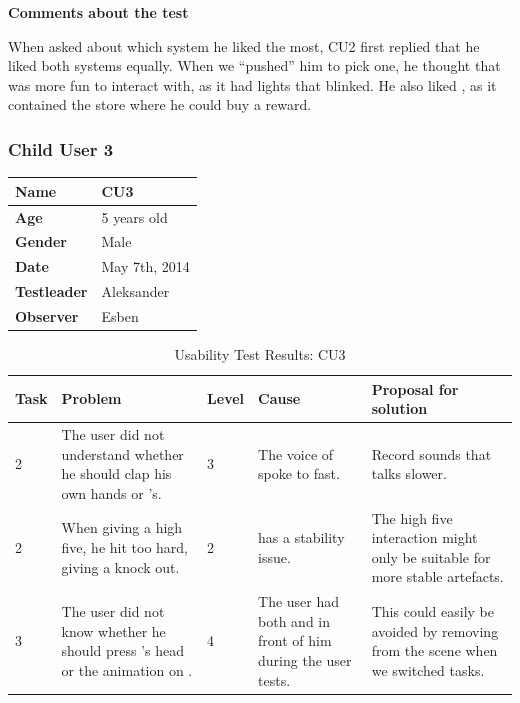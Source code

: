 \textbf{Comments about the test}

When asked about which system he liked the most, CU2 first replied that he liked both systems equally. When we ``pushed'' him to pick one, he thought that \ab{} was more fun to interact with, as it had lights that blinked. He also liked \app{}, as it contained the store where he could buy a reward. 

\subsubsection{Child User 3}
\begin{table}[H]
\centering
\begin{tabular}{| p{4.0cm} | p{4.0cm} |}
\hline
 \textbf{Name} & CU3 \\
 \hline
 \textbf{Age} & 5 years old \\
 \hline 
 \textbf{Gender} & Male \\
 \hline
 \textbf{Date} & May 7th, 2014 \\
 \hline
 \textbf{Testleader} & Aleksander \\
 \hline
 \textbf{Observer} & Esben \\
 \hline
\end{tabular}
\end{table}


\begin{table}[H]
\centering
\begin{tabular}{| p{1.0cm} | p{4.0cm} | p{0.9cm} | p{3.1cm} | p{3.5cm} |}
	\hline
	\textbf{Task} & \textbf{Problem} & \textbf{Level} & \textbf{Cause} & \textbf{Proposal for solution} \\
	\hline
	2 & The user did not understand whether he should clap his own hands or \ab{}'s. & 3 & The voice of \ab{} spoke to fast. & Record sounds that talks slower. \\
	\hline
	2 & When giving \ab{} a high five, he hit too hard, giving \ab{} a knock out. & 2 & \ab{} has a stability issue. & The high five interaction might only be suitable for more stable artefacts. \\
	\hline
	3 & The user did not know whether he should press \ab{}'s head or the animation on \app{}. & 4 & The user had both \ab{} and \app{} in front of him during the user tests. & This could easily be avoided by removing \ab{} from the scene when we switched tasks. \\
	\hline  
\end{tabular}
\caption{Usability Test Results: CU3}
\label{tab:testchild3}
\end{table}


